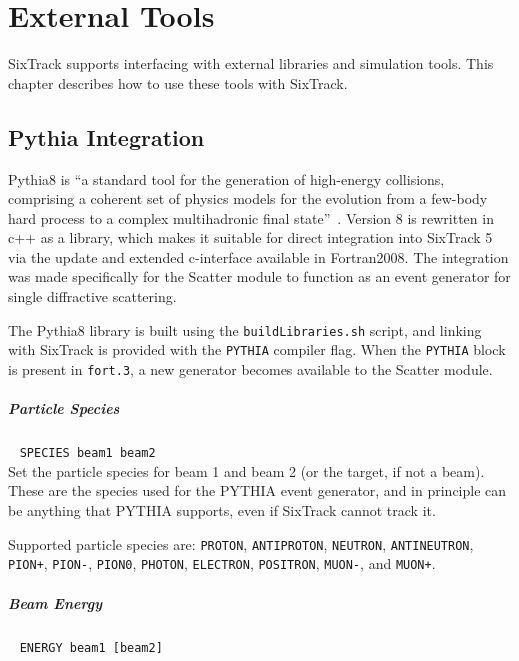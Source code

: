 
\chapter{External Tools} \label{ExtTools}

SixTrack supports interfacing with external libraries and simulation tools.
This chapter describes how to use these tools with SixTrack.

\section{Pythia Integration} \label{ExtPythia}

Pythia8 is ``a standard tool for the generation of high-energy collisions, comprising a coherent set of physics models for the evolution from a few-body hard process to a complex multihadronic final state''~\cite{pythia8}.
Version 8 is rewritten in c++ as a library, which makes it suitable for direct integration into SixTrack 5 via the update and extended c-interface available in Fortran2008.
The integration was made specifically for the Scatter module to function as an event generator for single diffractive scattering.

The Pythia8 library is built using the \texttt{buildLibraries.sh} script, and linking with SixTrack is provided with the \texttt{PYTHIA} compiler flag.
When the \texttt{PYTHIA} block is present in \texttt{fort.3}, a new generator becomes available to the Scatter module.

\paragraph{Particle Species}~ \texttt{SPECIES beam1 beam2}\\

Set the particle species for beam 1 and beam 2 (or the target, if not a beam).
These are the species used for the PYTHIA event generator, and in principle can be anything that PYTHIA supports, even if SixTrack cannot track it.

Supported particle species are: \texttt{PROTON}, \texttt{ANTIPROTON}, \texttt{NEUTRON}, \texttt{ANTINEUTRON}, \texttt{PION+}, \texttt{PION-}, \texttt{PION0}, \texttt{PHOTON}, \texttt{ELECTRON}, \texttt{POSITRON}, \texttt{MUON-}, and \texttt{MUON+}.

\paragraph{Beam Energy}~ \texttt{ENERGY beam1 [beam2]}\\

